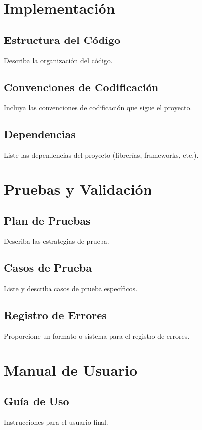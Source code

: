 \documentclass[a4paper, 12pt]{report}
\begin{document}
	\chapter{Implementación}
	\section{Estructura del Código}
	Describa la organización del código.
	
	\section{Convenciones de Codificación}
	Incluya las convenciones de codificación que sigue el proyecto.
	
	\section{Dependencias}
	Liste las dependencias del proyecto (librerías, frameworks, etc.).
	
	\chapter{Pruebas y Validación}
	\section{Plan de Pruebas}
	Describa las estrategias de prueba.
	
	\section{Casos de Prueba}
	Liste y describa casos de prueba específicos.
	
	\section{Registro de Errores}
	Proporcione un formato o sistema para el registro de errores.
	
	\chapter{Manual de Usuario}
	\section{Guía de Uso}
	Instrucciones para el usuario final.
	
\end{document}
